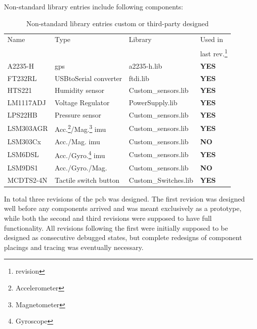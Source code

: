 Non-standard library entries include following components:\\
\begin{minipage}{\linewidth}
\begin{table}[H]
\centering
	\begin{tabular}{ l | l | l | l }
 	Name		& Type 								& Library 				& Used in         \\
 			&									&					& last rev.\footnote{revision}\\\hline
  	A2235-H  	& \gls{gps} 								& a2235-h.lib 			& \textbf{YES}\\
  	FT232RL 	& USBtoSerial converter 						& ftdi.lib\cite{ftdi}			& \textbf{YES}\\
  	HTS221 	& Humidity sensor 							& Custom\_sensors.lib 		& \textbf{YES}\\
  	LM1117ADJ 	& Voltage Regulator						& PowerSupply.lib\cite{lm1117} 	& \textbf{YES}\\
  	LPS22HB 	& Pressure sensor  							& Custom\_sensors.lib 		& \textbf{YES}\\
  	LSM303AGR	& Acc.\footnote{Accelerometer}/Mag.\footnote{Magnetometer} \gls{imu} & Custom\_sensors.lib & \textbf{YES}\\
  	LSM303Cx 	& Acc./Mag. \gls{imu} 						& Custom\_sensors.lib		& \textbf{NO} \\
  	LSM6DSL 	& Acc./Gyro.\footnote{Gyroscope} \gls{imu} 			& Custom\_sensors.lib 		& \textbf{YES}\\
  	LSM9DS1 	& Acc./Gyro./Mag. 							& Custom\_sensors.lib 		& \textbf{NO} \\
  	MCDTS2-4N 	& Tactile switch button 						& Custom\_Switches.lib 		& \textbf{YES}\\
\end{tabular}
\caption{Non-standard library entries custom or third-party designed}
\label{table:nstdlibs}
\end{table}
\end{minipage}

In total three revisions of the \gls{pcb} was designed. The first revision was designed well before any components arrived and was meant exclusively as a prototype, while both the second and third revisions were supposed to have full functionality. All revisions following the first were initially supposed to be designed as consecutive debugged states, but complete redesigns of component placings and tracing was eventually necessary.

